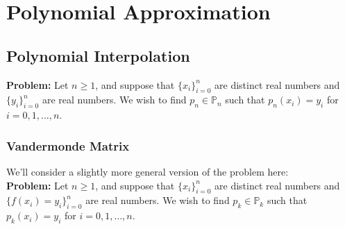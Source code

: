 \documentclass[12pt]{article}
\theoremstyle{definition}
\theoremstyle{definition}
\begin{document}
\section{Polynomial Approximation}
\subsection{Polynomial Interpolation}

\noindent\textbf{Problem:} Let $n\geq 1$, and suppose that $\{x_i\}_{i=0}^n$ are distinct real numbers and $\{y_i\}_{i=0}^n$ are real numbers. We wish to find $p_n \in \mathbb{P}_n$ such that $p_n(x_i) = y_i$ for $i=0,1,\ldots,n$.

\subsubsection{Vandermonde Matrix}

\noindent We'll consider a slightly more general version of the problem here: \\

\noindent\textbf{Problem:} Let $n\geq 1$, and suppose that $\{x_i\}_{i=0}^n$ are distinct real numbers and $\{f(x_i) = y_i\}_{i=0}^n$ are real numbers. We wish to find $p_k \in \mathbb{P}_k$ such that $p_k(x_i) = y_i$ for $i=0,1,\ldots,n$. \\
\end{document}
